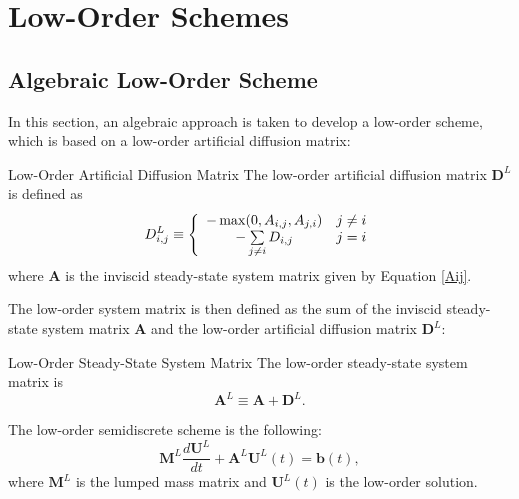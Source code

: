 \section{Low-Order Schemes}
\subsection{Algebraic Low-Order Scheme}\label{algebraicloworder}
In this section, an algebraic approach is taken to develop a low-order scheme,
which is based on a low-order artificial diffusion matrix:
\begin{definition}{Low-Order Artificial Diffusion Matrix}{}
   The low-order artificial diffusion matrix $\mathbf{D}^L$ is defined as
   \begin{equation}
      D_{i,j}^L \equiv \left\{\begin{array}{c c}
         -\max(0,A_{i,j},A_{j,i}) & j\ne i\\
         -\sum\limits_{j\ne i} D_{i,j} & j = i
      \end{array}\right.
   \end{equation}
   where $\mathbf{A}$ is the inviscid steady-state system matrix given by
   Equation \eqref{Aij}.
\end{definition}
The low-order system matrix is then defined as the sum of the inviscid
steady-state system matrix $\mathbf{A}$ and the low-order artificial diffusion
matrix $\mathbf{D}^L$:
\begin{definition}{Low-Order Steady-State System Matrix}{}
   The low-order steady-state system matrix is
   \begin{equation}\label{systemmatrixdef}
      \mathbf{A}^L \equiv \mathbf{A} + \mathbf{D}^L.
   \end{equation}
\end{definition}
The low-order semidiscrete scheme is the following:
\begin{equation}\label{semidiscretelow}
   \mathbf{M}^L\frac{d\mathbf{U}^L}{dt}+\mathbf{A}^L \mathbf{U}^L(t) = \mathbf{b}(t),
\end{equation}
where $\mathbf{M}^L$ is the lumped mass matrix and $\mathbf{U}^L(t)$ is the low-order
solution.
